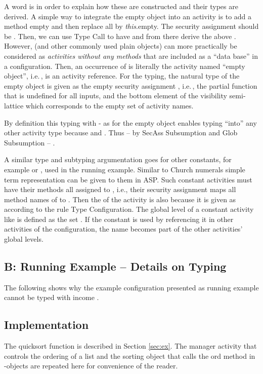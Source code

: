 \documentclass[10pt, conference, compsocconf]{IEEEtran}
\newcommand\aspfunp{ASP}
\newcommand\ie{i.e.\!\,, }
\begin{document}
{A word is in order to explain how these are constructed and their types are derived. 
A simple way to integrate the empty object into an activity is to add a method empty and then 
replace all  by {\it this}.empty. The security assignment should be . 
Then, we can use {\sc Type Call} to have  
and from there derive the above 
.
However,  (and other commonly used plain objects) can more practically be considered as
{\it activities without any  methods} that are included as a ``data base''
in a configuration. Then, an occurrence of  is literally the activity named ``empty object'',
\ie  is an activity reference. 
For the typing, the natural type of the empty object is given as the empty security assignment 
, \ie the partial function that is undefined for all inputs, and the
bottom element  of the visibility semi-lattice which corresponds to the empty set of
activity names.

By definition this typing with - as  for the empty object enables
typing  ``into'' any other activity type  because  and
. Thus -- by {\sc SecAss Subsumption}  and {\sc Glob Subsumption} -- 
. 

A similar type and subtyping argumentation goes for other constants, for example  or , used in
the running example. Similar to Church numerals simple term representation can be given to them
in \aspfunp. Such constant activities  must have their methods all assigned to , i.e.,
their security assignment  maps all method names of  to . Then the
 of the activity  is also  because it is given as  according to 
the rule {\sc Type Configuration}. The global level of a constant activity like  
is defined as the set . If the constant  is used by referencing
it in other activities of the configuration, the name  becomes part of the
other activities' global levels.


\subsection*{B: Running Example -- Details on Typing}
The following shows why the example configuration presented as running example cannot be typed
with income . 

\subsection*{Implementation}
The quicksort function  is described in Section \ref{sec:ex}.
The manager activity that controls the ordering of a list and the sorting object  that
calls the ord method in -objects are repeated here for convenience of the reader.

}
\end{document}
